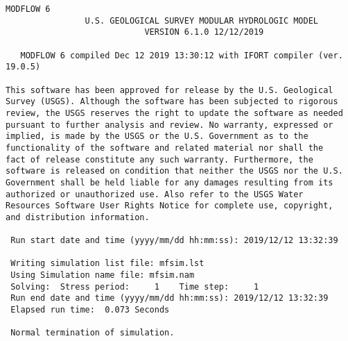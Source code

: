 {\small
\begin{lstlisting}[style=modeloutput]
                                   MODFLOW 6
                U.S. GEOLOGICAL SURVEY MODULAR HYDROLOGIC MODEL
                            VERSION 6.1.0 12/12/2019

   MODFLOW 6 compiled Dec 12 2019 13:30:12 with IFORT compiler (ver. 19.0.5)

This software has been approved for release by the U.S. Geological
Survey (USGS). Although the software has been subjected to rigorous
review, the USGS reserves the right to update the software as needed
pursuant to further analysis and review. No warranty, expressed or
implied, is made by the USGS or the U.S. Government as to the
functionality of the software and related material nor shall the
fact of release constitute any such warranty. Furthermore, the
software is released on condition that neither the USGS nor the U.S.
Government shall be held liable for any damages resulting from its
authorized or unauthorized use. Also refer to the USGS Water
Resources Software User Rights Notice for complete use, copyright,
and distribution information.

 Run start date and time (yyyy/mm/dd hh:mm:ss): 2019/12/12 13:32:39

 Writing simulation list file: mfsim.lst
 Using Simulation name file: mfsim.nam
 Solving:  Stress period:     1    Time step:     1
 Run end date and time (yyyy/mm/dd hh:mm:ss): 2019/12/12 13:32:39
 Elapsed run time:  0.073 Seconds

 Normal termination of simulation.

\end{lstlisting}
}
